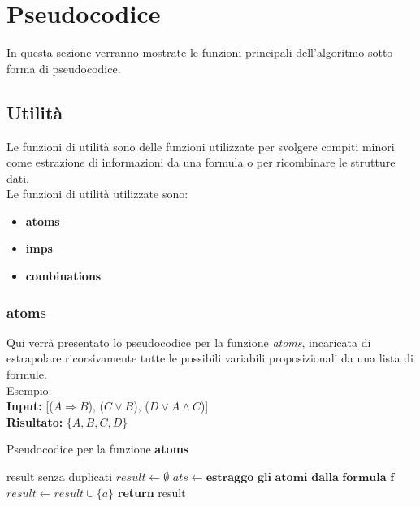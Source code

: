 \documentclass[\main/tesi.tex]{subfiles}
\begin{document}
\chapter{Pseudocodice}

In questa sezione verranno mostrate le funzioni principali dell'algoritmo sotto forma di pseudocodice.

\section{Utilità}

Le funzioni di utilità sono delle funzioni utilizzate per svolgere compiti minori come estrazione di informazioni da una formula o per ricombinare le strutture dati. \\

Le funzioni di utilità utilizzate sono:
\begin{itemize}
    \item \textbf{atoms}
    \item \textbf{imps}
    \item \textbf{combinations}
\end{itemize}

\newpage

\subsection{atoms}
Qui verrà presentato lo pseudocodice per la funzione \textit{atoms}, incaricata di estrapolare ricorsivamente tutte le possibili variabili proposizionali da una lista di formule. \\
Esempio: \\
\textbf{Input:} [($A \Rightarrow B$), ($C \lor B$), ($D \lor A \land C$)] \\
\textbf{Risultato:} $\{A, B, C, D\}$

\begin{algorithm}
    \caption{Pseudocodice per la funzione \textbf{atoms}}\label{alg:atoms}
    \begin{algorithmic}
        \Ensure result senza duplicati
        \State $result \gets \emptyset$
        \State $ats \gets \textbf{estraggo gli atomi dalla formula f}$
        \State $result \gets result \cup \{a\}$
        \EndIf
        \EndFor
        \EndFor
        \State \textbf{return} result
        \EndFunction
    \end{algorithmic}
\end{algorithm}
\end{document}
